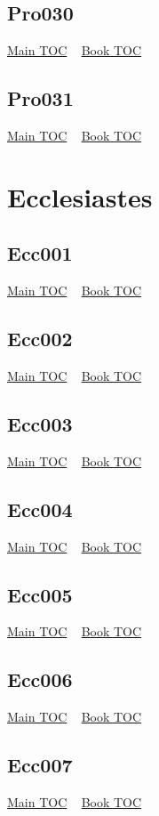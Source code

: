 \documentclass{book}
\begin{document}
  \section{Pro030}\hyperlink{toc}{Main TOC} ~ \hyperref[subsec:Pro]{Book TOC} 
  \section{Pro031}\hyperlink{toc}{Main TOC} ~ \hyperref[subsec:Pro]{Book TOC} 
  \chapter{Ecclesiastes} \label{subsec:Ecc} \begin{multicols}{2} \minitoc \end{multicols}
  \section{Ecc001}\hyperlink{toc}{Main TOC} ~ \hyperref[subsec:Ecc]{Book TOC} 
  \section{Ecc002}\hyperlink{toc}{Main TOC} ~ \hyperref[subsec:Ecc]{Book TOC} 
  \section{Ecc003}\hyperlink{toc}{Main TOC} ~ \hyperref[subsec:Ecc]{Book TOC} 
  \section{Ecc004}\hyperlink{toc}{Main TOC} ~ \hyperref[subsec:Ecc]{Book TOC} 
  \section{Ecc005}\hyperlink{toc}{Main TOC} ~ \hyperref[subsec:Ecc]{Book TOC} 
  \section{Ecc006}\hyperlink{toc}{Main TOC} ~ \hyperref[subsec:Ecc]{Book TOC} 
  \section{Ecc007}\hyperlink{toc}{Main TOC} ~ \hyperref[subsec:Ecc]{Book TOC} 
\end{document}
